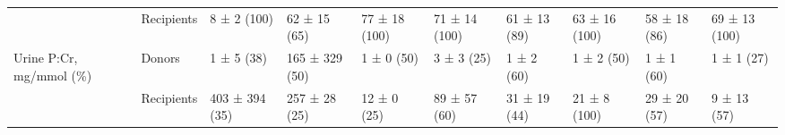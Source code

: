 {\begin{tabular}{p{2.5cm}p{1.5cm}p{2.5cm}p{2.25cm}p{2.25cm}p{2.25cm}p{2.25cm}p{2.25cm}p{2.25cm}p{2.25cm}}
 & Recipients & 8 ± 2 (100) & 62 ± 15 (65) & 77 ± 18 (100) & 71 ± 14 (100) & 61 ± 13 (89) & 63 ± 16 (100) & 58 ± 18 (86) & 69 ± 13 (100) \\
\multirow{2}{2.5cm}{Urine P:Cr, mg/mmol (\%)} & Donors & 1 ± 5 (38) & 165 ± 329 (50) & 1 ± 0 (50) & 3 ± 3 (25) & 1 ± 2 (60) & 1 ± 2 (50) & 1 ± 1 (60) & 1 ± 1 (27) \\
 & Recipients & 403 ± 394 (35) & 257 ± 28 (25) & 12 ± 0 (25) & 89 ± 57 (60) & 31 ± 19 (44) & 21 ± 8 (100) & 29 ± 20 (57) & 9 ± 13 (57)
 \\
 \bottomrule
\end{tabular}}
